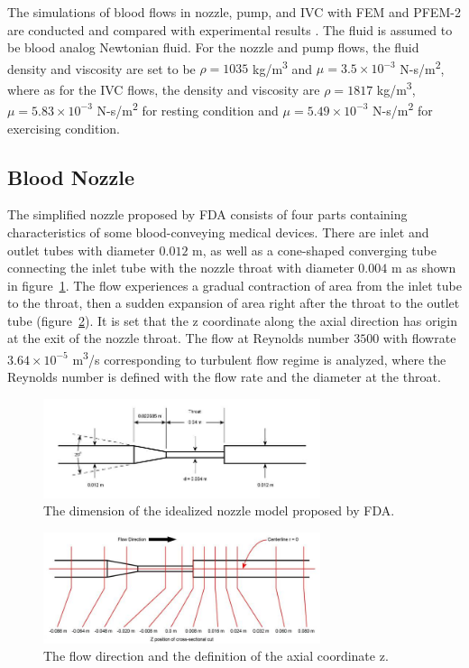 The simulations of blood flows in nozzle, pump, and IVC with FEM and PFEM-2 are conducted and compared with experimental results \cite{fda_res,fda_nozzle ,fda_pump,gallagher_exp}. The fluid is assumed to be blood analog Newtonian fluid. For the nozzle and pump flows, the fluid density and viscosity are set to be $\rho= 1035$ kg/m\textsuperscript{3} and $\mu =3.5\times10^{-3}$ N-s/m\textsuperscript{2}, where as for the IVC flows, the density and viscosity are $\rho=1817$ kg/m\textsuperscript{3}, $\mu=5.83\times10^{-3}$ N-s/m\textsuperscript{2} for resting condition and $\mu=5.49\times10^{-3}$ N-s/m\textsuperscript{2} for exercising condition. 

\subsection{Blood Nozzle}

The simplified nozzle proposed by FDA consists of four parts containing characteristics of some blood-conveying medical devices. There are inlet and outlet tubes with diameter $0.012$ m, as well as a cone-shaped converging tube connecting the inlet tube with the nozzle throat with diameter $0.004$ m as shown in figure~\ref{fig:nozzlegeo1}. The flow experiences a gradual contraction of area from the inlet tube to the throat, then a sudden expansion of area right after the throat to the outlet tube (figure~\ref{fig:nozzlegeo2}). It is set that the z coordinate along the axial direction has origin at the exit of the nozzle throat. The flow at Reynolds number $3500$ with flowrate $3.64\times10^{-5}$ m\textsuperscript{3}/s corresponding to turbulent flow regime is analyzed, where the Reynolds number is defined with the flow rate and the diameter at the throat. 

\begin{figure}[htbp]
    \centering
    \includegraphics[width=3.2in]{imgs/nozzle_pump/nozzle_geo.jpg}
    \caption{The dimension of the idealized nozzle model proposed by FDA.}
    \label{fig:nozzlegeo1}
\end{figure}
\begin{figure}[htbp]
    \centering
    \includegraphics[width=3.2in]{imgs/nozzle_pump/nozzle_CS.jpg}
    \caption{The flow direction and the definition of the axial coordinate z.}
    \label{fig:nozzlegeo2}
\end{figure}


